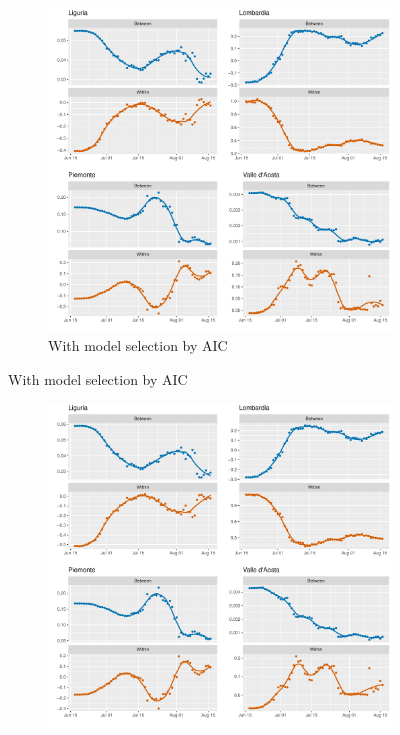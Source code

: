 \documentclass[12pt]{article}
\begin{document}
\begin{appendices}
\begin{figure}[H]
\begin{subfigure}{\textwidth}
    	      \includegraphics[width=\linewidth]{output/model_between_lag14_betas_Nord-Ovest_aic_rolling.pdf}
    	      \caption{With model selection by AIC}
    	      \label{fig:beta_between_over_time_nordovest_aic}
    	    \end{subfigure}
    	\end{figure}
        \begin{figure}[H]\ContinuedFloat
    	    \begin{subfigure}{\textwidth}
    	      \centering
    	      \includegraphics[width=\linewidth]{output/model_between_lag14_betas_Nord-Ovest_UndocQuadratic_rolling.pdf}

\end{subfigure}
\end{figure}
\end{appendices}
\end{document}
